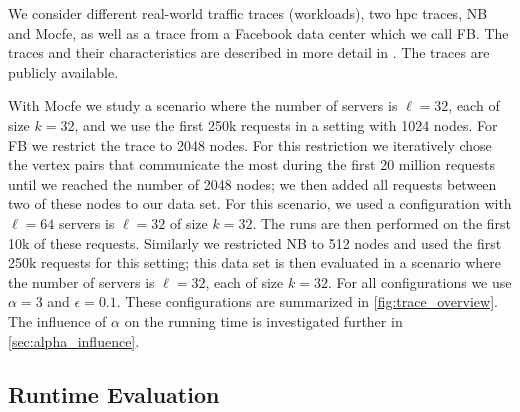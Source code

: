 \documentclass[a4paper,UKenglish,cleveref, autoref, thm-restate,authorcolumns]{lipics-v2019}
\newcommand{\fb}{FB}
\newcommand{\dbmocfe}{Mocfe}
\newcommand{\dbnekbone}{NB}
\begin{document}
We consider different real-world traffic traces (workloads),
two hpc traces, \dbnekbone{} and \dbmocfe{}, as well as a trace from 
a Facebook data center which we call \fb{}.
 The traces and their characteristics 
are described in more detail in \cite{Avin2019}.
The traces are publicly available.

With \dbmocfe{} we study a scenario 
where the number of servers is $\ell=32$, each of size $k=32$, and 
we use the first 250k requests in a setting with 1024 nodes. 
For \fb{} we restrict the trace to 2048 nodes. For this restriction we 
 iteratively chose the vertex pairs that communicate the most during the first 20 million requests 
until we reached the number of 2048 nodes; we 
then added all requests between two of these nodes to our data set. 
For this scenario, we used a configuration with $\ell=64$ 
servers is $\ell=32$ of size $k=32$.
The runs are then performed on the first 10k of these requests. Similarly we  restricted \dbnekbone{} to 512 nodes and 
used the first 250k requests for this setting; 
this data set is then evaluated in a scenario where the number of servers is $\ell=32$, each of size $k=32$.
For all configurations we use $\alpha=3$ and $\epsilon=0.1$.
These configurations are summarized in \cref{fig:trace_overview}.
The influence of $\alpha$ on the running time is investigated further in \cref{sec:alpha_influence}.

\subsection{Runtime Evaluation}
\end{document}
